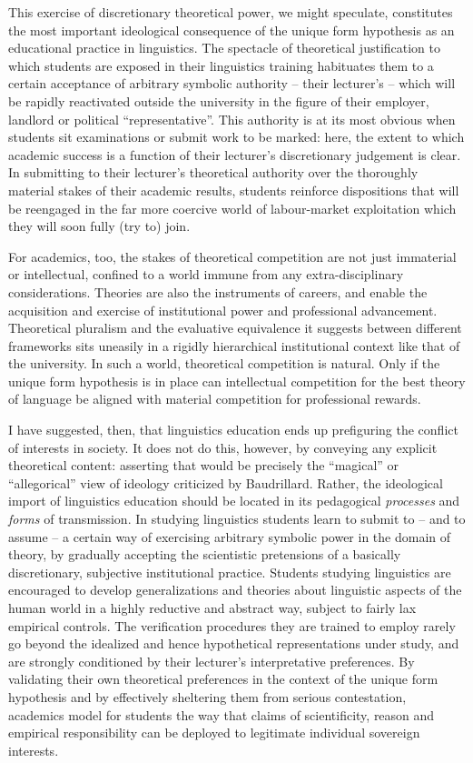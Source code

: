 \documentclass[output=paper]{langscibook}
\begin{document}
This exercise of discretionary theoretical power, we might speculate, constitutes the most important ideological consequence of the unique form hypothesis as an educational practice in linguistics. The spectacle of theoretical justification to which students are exposed in their linguistics training habituates them to a certain acceptance of arbitrary symbolic authority -- their lecturer's -- which will be rapidly reactivated outside the university in the figure of their employer, landlord or political ``representative''. This authority is at its most obvious when students sit examinations or submit work to be marked: here, the extent to which academic success is a function of their lecturer's discretionary judgement is clear. In submitting to their lecturer's theoretical authority over the thoroughly material stakes of their academic results, students reinforce dispositions that will be reengaged in the far more coercive world of labour-market exploitation which they will soon fully (try to) join.

For academics, too, the stakes of theoretical competition are not just immaterial or intellectual, confined to a world immune from any extra-disciplinary considerations. Theories are also the instruments of careers, and enable the acquisition and exercise of institutional power and professional advancement. Theoretical pluralism and the evaluative equivalence it suggests between different frameworks sits uneasily in a rigidly hierarchical institutional context like that of the university. In such a world, theoretical competition is natural. Only if the unique form hypothesis is in place can intellectual competition for the best theory of language be aligned with material competition for professional rewards.

I have suggested, then, that linguistics education ends up prefiguring the conflict of interests in society. It does not do this, however, by conveying any explicit theoretical content: asserting that would be precisely the ``magical'' or ``allegorical'' view of ideology criticized by Baudrillard. Rather, the ideological import of linguistics education should be located in its pedagogical \emph{processes} and \emph{forms} of transmission. In studying linguistics students learn to submit to -- and to assume -- a certain way of exercising arbitrary symbolic power in the domain of theory, by gradually accepting the scientistic pretensions of a basically discretionary, subjective institutional practice. Students studying linguistics are encouraged to develop generalizations and theories about linguistic aspects of the human world in a highly reductive and abstract way, subject to fairly lax empirical controls. The verification procedures they are trained to employ rarely go beyond the idealized and hence hypothetical representations under study, and are strongly conditioned by their lecturer's interpretative preferences. By validating their own theoretical preferences in the context of the unique form hypothesis and by effectively sheltering them from serious contestation, academics model for students the way that claims of scientificity, reason and empirical responsibility can be deployed to legitimate individual sovereign interests.
\end{document}
